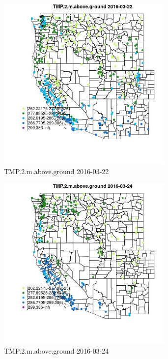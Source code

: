 \begin{figure} 
\centering  
\includegraphics[width=0.77\textwidth]{Code_Outputs/Report_ML_input_PM25_Step4_part_e_de_duplicated_aveswNAs_MapObsTMP2maboveground2016-03-22.jpg} 
\caption{\label{fig:Report_ML_input_PM25_Step4_part_e_de_duplicated_aveswNAsMapObsTMP2maboveground2016-03-22}TMP.2.m.above.ground 2016-03-22} 
\end{figure} 
 

\begin{figure} 
\centering  
\includegraphics[width=0.77\textwidth]{Code_Outputs/Report_ML_input_PM25_Step4_part_e_de_duplicated_aveswNAs_MapObsTMP2maboveground2016-03-24.jpg} 
\caption{\label{fig:Report_ML_input_PM25_Step4_part_e_de_duplicated_aveswNAsMapObsTMP2maboveground2016-03-24}TMP.2.m.above.ground 2016-03-24} 
\end{figure} 
 

